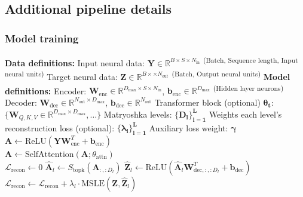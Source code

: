 \subsection{Additional pipeline details}
\label{subsection:additional_pipeline_details}

\subsubsection{Model training}
\label{subsubsection:model_training_details}

\begin{algorithm}[h]
\caption{Model training procedure}
\label{algorithm:sded_model_training}
\begin{algorithmic}[1]
\State \textbf{Data definitions:}
\State \quad Input neural data: $\mathbf{Y} \in \mathbb{R}^{B \times S \times N_{\text{in}}}$ \textsuperscript{(Batch, Sequence length, Input neural units)}
\State \quad Target neural data: $\mathbf{Z} \in \mathbb{R}^{B \times \times N_{\text{out}}}$ \textsuperscript{(Batch, Output neural units)}
\State \textbf{Model definitions:}
\State \quad Encoder: $\mathbf{W}_{\text{enc}} \in \mathbb{R}^{D_{\text{max}} \times S \times N_{\text{in}}}$, $\mathbf{b}_{\text{enc}} \in \mathbb{R}^{D_{\text{max}}}$ \textsuperscript{(Hidden layer neurons)}
\State \quad Decoder: $\mathbf{W}_{\text{dec}} \in \mathbb{R}^{N_{\text{out}} \times D_{\text{max}}}$, $\mathbf{b}_{\text{dec}} \in \mathbb{R}^{N_{\text{out}}}$
\State \quad Transformer block (optional) $\mathbf{\theta_{t}}$: $\{\mathbf{W}_{Q,K,V} \in \mathbb{R}^{D_{\max} \times D_{\max}}, \dots\}$
\State \quad Matryoshka levels: $\mathbf{\{D_l\}_{l=1}^L}$
\State \quad Weights each level's reconstruction loss (optional): $\mathbf{\{\lambda_l\}_{l=1}^L}$
\State \quad Auxiliary loss weight: $\mathbf{\gamma}$
\\
    \Statex {}
    \State $\mathbf{A} \gets \text{ReLU}(\mathbf{Y}\mathbf{W}_{\text{enc}}^T + \mathbf{b}_{\text{enc}})$ 
    \\
        \State $\mathbf{A} \gets \text{SelfAttention}(\mathbf{A}; \theta_{\text{attn}})$ 
    \EndIf
    \\
    \State $\mathcal{L}_{\text{recon}} \gets 0$
     
        \State $\hat{\mathbf{A}}_l \gets S_{\text{topk}}(\mathbf{A}_{:, :D_l})$ 
        \State $\hat{\mathbf{Z}}_l \gets \text{ReLU}(\hat{\mathbf{A}}_l \mathbf{W}_{\text{dec}, :, :D_l}^T + \mathbf{b}_{\text{dec}})$ 
        \State $\mathcal{L}_{\text{recon}} \gets \mathcal{L}_{\text{recon}} + \lambda_l \cdot \text{MSLE}(\mathbf{Z}, \hat{\mathbf{Z}}_l)$ 
    \EndFor
    

\end{algorithmic}
\end{algorithm}
